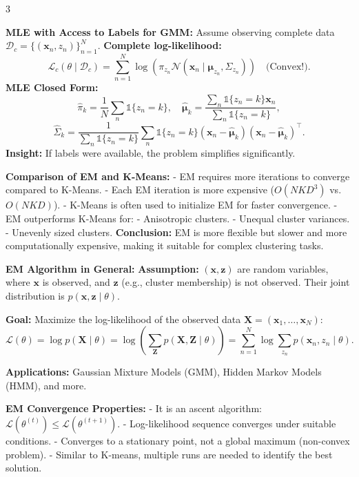 \documentclass[landscape, 10pt]{article}
\begin{document}
\begin{multicols*}{3}
{\item \textbf{MLE with Access to Labels for GMM:}  
Assume observing complete data $\mathcal{D}_c = \{(\mathbf{x}_n, z_n)\}_{n=1}^N$.  
\textbf{Complete log-likelihood:}  
\[
\mathcal{L}_c(\theta \mid \mathcal{D}_c) = \sum_{n=1}^N \log \left(\pi_{z_n} \mathcal{N}(\mathbf{x}_n \mid \boldsymbol{\mu}_{z_n}, \Sigma_{z_n}) \right) \quad \text{(Convex!)}.
\]  
\textbf{MLE Closed Form:}  
\[
\hat{\pi}_k = \frac{1}{N} \sum_n \mathbb{1}\{z_n = k\}, \quad \hat{\boldsymbol{\mu}}_k = \frac{\sum_n \mathbb{1}\{z_n = k\} \mathbf{x}_n}{\sum_n \mathbb{1}\{z_n = k\}},
\]
\[
\hat{\Sigma}_k = \frac{1}{\sum_n \mathbb{1}\{z_n = k\}} \sum_n \mathbb{1}\{z_n = k\} (\mathbf{x}_n - \hat{\boldsymbol{\mu}}_k)(\mathbf{x}_n - \hat{\boldsymbol{\mu}}_k)^\top.
\]  
\textbf{Insight:} If labels were available, the problem simplifies significantly.

\item \textbf{Comparison of EM and K-Means:}  
- EM requires more iterations to converge compared to K-Means.  
- Each EM iteration is more expensive ($O(NKD^3)$ vs. $O(NKD)$).  
- K-Means is often used to initialize EM for faster convergence.  
- EM outperforms K-Means for:  
  - Anisotropic clusters.  
  - Unequal cluster variances.  
  - Unevenly sized clusters.  
\textbf{Conclusion:} EM is more flexible but slower and more computationally expensive, making it suitable for complex clustering tasks.

\item \textbf{EM Algorithm in General:}  
\textbf{Assumption:} $(\mathbf{x}, \mathbf{z})$ are random variables, where $\mathbf{x}$ is observed, and $\mathbf{z}$ (e.g., cluster membership) is not observed. Their joint distribution is $p(\mathbf{x}, \mathbf{z} \mid \theta)$.  

\textbf{Goal:} Maximize the log-likelihood of the observed data $\mathbf{X} = (\mathbf{x}_1, \dots, \mathbf{x}_N)$:  
\[
\mathcal{L}(\theta) = \log p(\mathbf{X} \mid \theta) = \log \left( \sum_{\mathbf{Z}} p(\mathbf{X}, \mathbf{Z} \mid \theta) \right) = \sum_{n=1}^N \log \sum_{z_n} p(\mathbf{x}_n, z_n \mid \theta).
\]  

\textbf{Applications:} Gaussian Mixture Models (GMM), Hidden Markov Models (HMM), and more.

\item \textbf{EM Convergence Properties:}  
- It is an ascent algorithm: $\mathcal{L}(\theta^{(t)}) \leq \mathcal{L}(\theta^{(t+1)})$.  
- Log-likelihood sequence converges under suitable conditions.  
- Converges to a stationary point, not a global maximum (non-convex problem).  
- Similar to K-means, multiple runs are needed to identify the best solution.

}

\end{multicols*}
\end{document}
